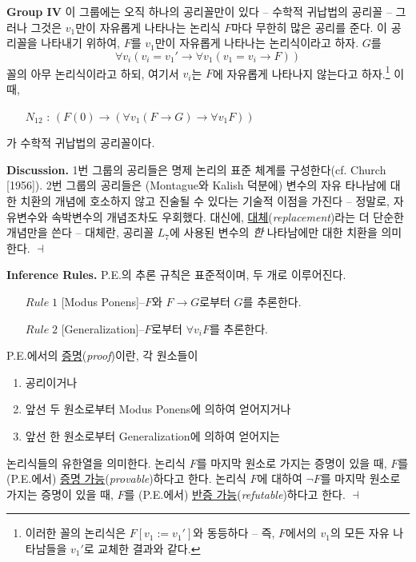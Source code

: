 \documentclass[12pt]{paper}
\newenvironment{context}[1][]
{ \noindent \textbf{{#1}.} }
{ \hfill $ \dashv $ }
\begin{document}
\noindent \textbf{Group IV}
이 그룹에는 오직 하나의 공리꼴만이 있다 -- 수학적 귀납법의 공리꼴 --
그러나 그것은 $v_1$만이 자유롭게 나타나는 논리식 $F$마다 무한히 많은 공리를 준다.
이 공리꼴을 나타내기 위하여, $F$를 $v_1$만이 자유롭게 나타나는 논리식이라고 하자.
$G$를 $$\forall v_i \left( v_i = v_1 ' \rightarrow \forall v_1 \left( v_1 = v_i \rightarrow F \right) \right)$$ 꼴의 아무 논리식이라고 하되,
여기서 $v_i$는 $F$에 자유롭게 나타나지 않는다고 하자.\footnote
{
이러한 꼴의 논리식은 $F \left[ v_1 := v_1 ' \right]$와 동등하다 -- 즉, $F$에서의 $v_1$의 모든 자유 나타남들을 $v_1 '$로 교체한 결과와 같다.
}
이때,
\begin{enumerate}
\item[$N_{12}$ :] $\left( F \left( 0 \right) \rightarrow \left( \forall v_1 \left( F \rightarrow G \right) \rightarrow \forall v_1 F \right) \right)$
\end{enumerate}
가 수학적 귀납법의 공리꼴이다.

\begin{context}[Discussion]
1번 그룹의 공리들은 명제 논리의 표준 체계를 구성한다(cf. Church [1956]).
2번 그룹의 공리들은 (Montague와 Kalish 덕분에) 변수의 자유 타나남에 대한 치환의 개념에 호소하지 않고 진술될 수 있다는 기술적 이점을 가진다 --
정말로, 자유변수와 속박변수의 개념조차도 우회했다.
대신에, \underline{대체}(\textit{replacement})라는 더 단순한 개념만을 쓴다 --
대체란, 공리꼴 $L_{7}$에 사용된 변수의 \textit{한} 나타남에만 대한 치환을 의미한다.
\end{context}

\begin{context}[Inference Rules]
P.E.의 추론 규칙은 표준적이며, 두 개로 이루어진다.
\begin{itemize}[leftmargin=.5in]
\item[$Rule \; \mathit{1}$] [Modus Ponens]--$F$와 $F \to G$로부터 $G$를 추론한다.
\item[$Rule \; \mathit{2}$] [Generalization]--$F$로부터 $\forall v_{i} F$를 추론한다.
\end{itemize}

P.E.에서의 \underline{증명}(\textit{proof})이란,
각 원소들이
\begin{enumerate}
\item 공리이거나
\item 앞선 두 원소로부터 Modus Ponens에 의하여 얻어지거나
\item 앞선 한 원소로부터 Generalization에 의하여 얻어지는
\end{enumerate}
논리식들의 유한열을 의미한다.
논리식 $F$를 마지막 원소로 가지는 증명이 있을 때,
$F$를 (P.E.에서) \underline{증명 가능}(\textit{provable})하다고 한다.
논리식 $F$에 대하여 $\lnot F$를 마지막 원소로 가지는 증명이 있을 때,
$F$를 (P.E.에서) \underline{반증 가능}(\textit{refutable})하다고 한다.
\end{context}
\end{document}
